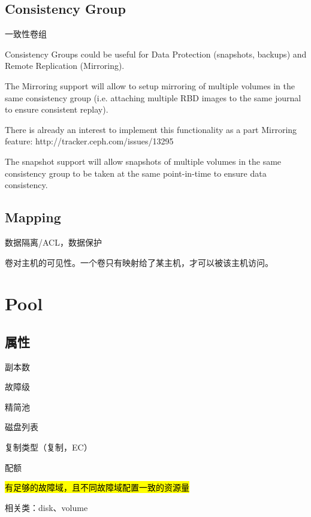 \section{Consistency Group}

一致性卷组 

\begin{shadequote}
Consistency Groups could be useful for Data Protection (snapshots, backups) and
Remote Replication (Mirroring).

The Mirroring support will allow to setup mirroring of multiple volumes in the
same consistency group (i.e. attaching multiple RBD images to the same journal
to ensure consistent replay).

There is already an interest to implement this functionality as a part Mirroring feature:
http://tracker.ceph.com/issues/13295

The snapshot support will allow snapshots of multiple volumes in the same
consistency group to be taken at the same point-in-time to ensure data
consistency.
\end{shadequote}

\section{Mapping}

数据隔离/ACL，数据保护

卷对主机的可见性。一个卷只有映射给了某主机，才可以被该主机访问。

\chapter{Pool}

\section{属性}

\begin{enumbox}
\item 副本数
\item 故障级
\item 精简池
\item 磁盘列表
\item 复制类型（复制，EC）
\item 配额
\item \hl{有足够的故障域，且不同故障域配置一致的资源量}
\end{enumbox}

相关类：disk、volume

